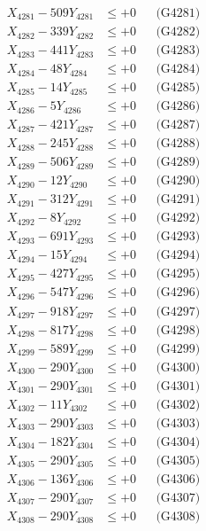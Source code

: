 \documentclass[a4paper,10pt]{article}
\begin{document}
{\begin{align}
\allowbreak
X_{4281} - 509Y_{4281} &\leq +0 && \text{(G4281)} \\
X_{4282} - 339Y_{4282} &\leq +0 && \text{(G4282)} \\
X_{4283} - 441Y_{4283} &\leq +0 && \text{(G4283)} \\
X_{4284} - 48Y_{4284} &\leq +0 && \text{(G4284)} \\
X_{4285} - 14Y_{4285} &\leq +0 && \text{(G4285)} \\
X_{4286} - 5Y_{4286} &\leq +0 && \text{(G4286)} \\
X_{4287} - 421Y_{4287} &\leq +0 && \text{(G4287)} \\
X_{4288} - 245Y_{4288} &\leq +0 && \text{(G4288)} \\
X_{4289} - 506Y_{4289} &\leq +0 && \text{(G4289)} \\
X_{4290} - 12Y_{4290} &\leq +0 && \text{(G4290)} \\
\allowbreak
X_{4291} - 312Y_{4291} &\leq +0 && \text{(G4291)} \\
X_{4292} - 8Y_{4292} &\leq +0 && \text{(G4292)} \\
X_{4293} - 691Y_{4293} &\leq +0 && \text{(G4293)} \\
X_{4294} - 15Y_{4294} &\leq +0 && \text{(G4294)} \\
X_{4295} - 427Y_{4295} &\leq +0 && \text{(G4295)} \\
X_{4296} - 547Y_{4296} &\leq +0 && \text{(G4296)} \\
X_{4297} - 918Y_{4297} &\leq +0 && \text{(G4297)} \\
X_{4298} - 817Y_{4298} &\leq +0 && \text{(G4298)} \\
X_{4299} - 589Y_{4299} &\leq +0 && \text{(G4299)} \\
X_{4300} - 290Y_{4300} &\leq +0 && \text{(G4300)} \\
\allowbreak
X_{4301} - 290Y_{4301} &\leq +0 && \text{(G4301)} \\
X_{4302} - 11Y_{4302} &\leq +0 && \text{(G4302)} \\
X_{4303} - 290Y_{4303} &\leq +0 && \text{(G4303)} \\
X_{4304} - 182Y_{4304} &\leq +0 && \text{(G4304)} \\
X_{4305} - 290Y_{4305} &\leq +0 && \text{(G4305)} \\
X_{4306} - 136Y_{4306} &\leq +0 && \text{(G4306)} \\
X_{4307} - 290Y_{4307} &\leq +0 && \text{(G4307)} \\
X_{4308} - 290Y_{4308} &\leq +0 && \text{(G4308)} \\

\end{align}}
\end{document}

